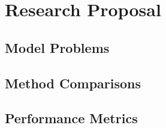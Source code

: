 \chapter{Research Proposal}
\label{ch:research_proposal}

\section{Model Problems}
\label{sec:model_problems}

\section{Method Comparisons}
\label{sec:method_comparisons}

\section{Performance Metrics}
\label{sec:performance_metrics}
